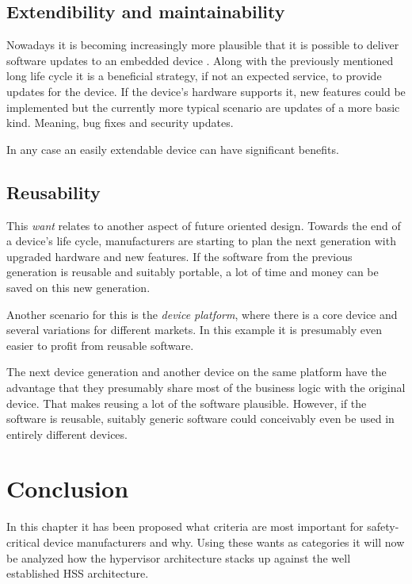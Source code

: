 \subsection{Extendibility and maintainability}
Nowadays it is becoming increasingly more plausible that it is possible to deliver software updates to an embedded device \cite{OndrejKachman.2016}. Along with the previously mentioned long life cycle it is a beneficial strategy, if not an expected service, to provide updates for the device.
If the device's hardware supports it, new features could be implemented but the currently more typical scenario are updates of a more basic kind. Meaning, bug fixes and security updates.

In any case an easily extendable device can have significant benefits.
\subsection{Reusability}
This \textit{want} relates to another aspect of future oriented design. Towards the end of a device's life cycle, manufacturers are starting to plan the next generation with upgraded hardware and new features. If the software from the previous generation is reusable and suitably portable, a lot of time and money can be saved on this new generation.

Another scenario for this is the \textit{device platform}, where there is a core device and several variations for different markets. In this example it is presumably even easier to profit from reusable software.

The next device generation and another device on the same platform have the advantage that they presumably share most of the business logic with the original device. That makes reusing a lot of the software plausible. However, if the software is reusable, suitably generic software could conceivably even be used in entirely different devices.

\section{Conclusion}
In this chapter it has been proposed what criteria are most important for safety-critical device manufacturers and why. Using these wants as categories it will now be analyzed how the hypervisor architecture stacks up against the well established \gls{HSS} architecture.